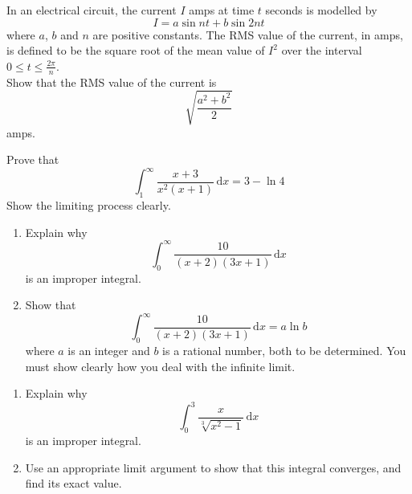 \documentclass[leqno]{article}
\begin{document}
\begin{enumerate}[
  label=\textbf{\arabic*.},
  leftmargin=*,
  topsep=0pt,
  partopsep=0pt,
  parsep=0pt
]
\newpage

\questionitem

In an electrical circuit, the current $I$ amps at time $t$ seconds is modelled by
\[ I = a\sin nt + b\sin 2nt \]
where $a$, $b$ and $n$ are positive constants. The RMS value of the current, in amps, is defined to be the square root of the mean value of $I^2$ over the interval $0 \le t \le \frac{2\pi}{n}$. \\

Show that the RMS value of the current is
\[\sqrt{\dfrac{a^2+b^2}{2}}\]
amps.  \\

\newpage

\questionitem

Prove that
\[\int_{1}^{\infty} \dfrac{x+3}{x^{2}(x+1)}\,\mathrm{d}x = 3 - \ln 4\]
Show the limiting process clearly.  \\

\newpage

\questionitem

\begin{enumerate}[label=\textbf{(\alph*)}]
  \item Explain why
  \[\int_{0}^{\infty} \dfrac{10}{(x+2)(3x+1)}\,\mathrm{d}x\]
  is an improper integral.  \\
  \item Show that
  \[\int_{0}^{\infty} \dfrac{10}{(x+2)(3x+1)}\,\mathrm{d}x = a\ln b\]
  where $a$ is an integer and $b$ is a rational number, both to be determined. You must show clearly how you deal with the infinite limit.  \\
\end{enumerate}

\newpage

\questionitem

\begin{enumerate}[label=\textbf{(\alph*)}]
  \item Explain why
  \[\int_0^3 \dfrac{x}{\sqrt[3]{x^2-1}}\,\mathrm{d}x\]
  is an improper integral.  \\
  \item Use an appropriate limit argument to show that this integral converges, and find its exact value.  \\
\end{enumerate}


\end{enumerate}
\end{document}
